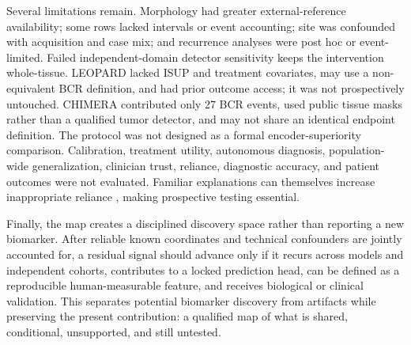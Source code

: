 Several limitations remain. Morphology had greater external-reference availability; some rows
lacked intervals or event accounting; site was confounded with acquisition and case mix; and
recurrence analyses were post hoc or event-limited. Failed independent-domain detector
sensitivity keeps the intervention whole-tissue. LEOPARD lacked ISUP and treatment covariates,
may use a non-equivalent BCR definition, and had prior outcome access; it was not prospectively
untouched. CHIMERA contributed only 27 BCR events, used public tissue masks rather than a
qualified tumor detector, and may not share an identical endpoint definition. The protocol was
not designed as a formal encoder-superiority comparison. Calibration,
treatment utility, autonomous diagnosis, population-wide generalization, clinician trust,
reliance, diagnostic accuracy, and patient outcomes were not evaluated. Familiar explanations
can themselves increase inappropriate reliance \cite{prinster2024}, making prospective testing
essential.

Finally, the map creates a disciplined discovery space rather than reporting a new biomarker.
After reliable known coordinates and technical confounders are jointly accounted for, a residual
signal should advance only if it recurs across models and independent cohorts, contributes to a
locked prediction head, can be defined as a reproducible human-measurable feature, and receives
biological or clinical validation. This separates potential biomarker discovery from artifacts
while preserving the present contribution: a qualified map of what is shared, conditional,
unsupported, and still untested.
